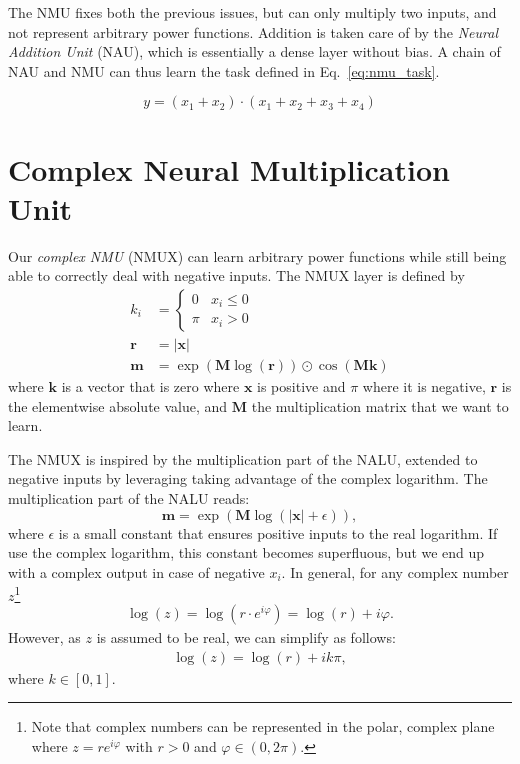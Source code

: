 \documentclass[9pt]{article}
\begin{document}
The NMU fixes both the previous issues, but can only multiply two inputs, and
not represent arbitrary power functions.  Addition is taken care of by the
\emph{Neural Addition Unit} (NAU), which is essentially a dense layer without
bias. A chain of NAU and NMU can thus learn the task defined in
Eq.~\ref{eq:nmu_task}.

\begin{equation}
  \label{eq:nmu_task}
  y = (x_1 + x_2) \cdot (x_1 + x_2 + x_3 + x_4)
\end{equation}


\section{Complex Neural Multiplication Unit}%
\label{sec:complex_neural_multiplication_unit}

Our \emph{complex NMU} (NMUX) can learn arbitrary power functions while still
being able to correctly deal with negative inputs.
The NMUX layer is defined by
\begin{align}
  k_i &= \begin{cases}
     0  & x_i \leq 0 \\
    \pi & x_i > 0
  \end{cases} \\
  \bm r &= |\bm x| \\
  \bm m &= \exp(\bm M \log(\bm r)) \odot \cos(\bm M \bm k)
\end{align}
where $\bm k$ is a vector that is zero where $\bm x$ is positive and $\pi$
where it is negative, $\bm r$ is the elementwise absolute value, and $\bm M$
the multiplication matrix that we want to learn.

The NMUX is inspired by the multiplication part of the NALU, extended to
negative inputs by leveraging taking advantage of the complex logarithm.
The multiplication part of the NALU reads:
\begin{equation}
  \bm m = \exp(\bm M \log(|\bm x| + \epsilon)),
\end{equation}
where $\epsilon$ is a small constant that ensures positive inputs to the real
logarithm.  If use the complex logarithm, this constant becomes superfluous,
but we end up with a complex output in case of negative $x_i$.  In general, for
any complex number $z$\footnote{Note that complex numbers can be represented in
the polar, complex plane where $z=re^{i\varphi}$ with $r>0$ and $\varphi \in
(0,2\pi)$.}
\begin{align}
  \log(z) = \log\left(r\cdot e^{i\varphi}\right)
     = \log(r) + i\varphi.
\end{align}
However, as $z$ is assumed to be real, we can simplify as follows:
\begin{align}
  \log(z) = \log(r) + ik\pi,
\end{align}
where $k \in [0,1]$.
\end{document}
